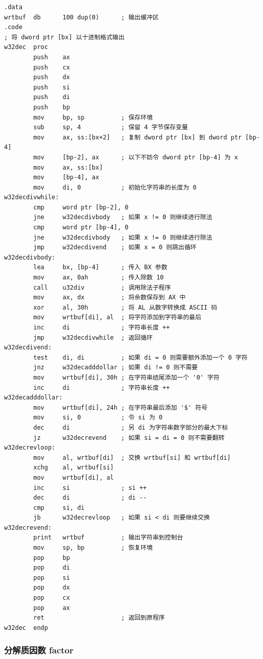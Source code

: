 \begin{lstlisting}[language={[x86masm]Assembler},morekeywords={}]
.data
wrtbuf  db      100 dup(0)      ; 输出缓冲区
.code
; 将 dword ptr [bx] 以十进制格式输出
w32dec  proc
        push    ax
        push    cx
        push    dx
        push    si
        push    di
        push    bp
        mov     bp, sp          ; 保存环境
        sub     sp, 4           ; 保留 4 字节保存变量
        mov     ax, ss:[bx+2]   ; 复制 dword ptr [bx] 到 dword ptr [bp-4]
        mov     [bp-2], ax      ; 以下不妨令 dword ptr [bp-4] 为 x
        mov     ax, ss:[bx]
        mov     [bp-4], ax
        mov     di, 0           ; 初始化字符串的长度为 0
w32decdivwhile:
        cmp     word ptr [bp-2], 0
        jne     w32decdivbody   ; 如果 x != 0 则继续进行除法
        cmp     word ptr [bp-4], 0
        jne     w32decdivbody   ; 如果 x != 0 则继续进行除法
        jmp     w32decdivend    ; 如果 x = 0 则跳出循环
w32decdivbody:
        lea     bx, [bp-4]      ; 传入 BX 参数
        mov     ax, 0ah         ; 传入除数 10
        call    u32div          ; 调用除法子程序
        mov     ax, dx          ; 将余数保存到 AX 中
        xor     al, 30h         ; 将 AL 从数字转换成 ASCII 码
        mov     wrtbuf[di], al  ; 将字符添加到字符串的最后
        inc     di              ; 字符串长度 ++
        jmp     w32decdivwhile  ; 返回循环
w32decdivend:
        test    di, di          ; 如果 di = 0 则需要额外添加一个 0 字符
        jnz     w32decadddollar ; 如果 di != 0 则不需要
        mov     wrtbuf[di], 30h ; 在字符串结尾添加一个 '0' 字符
        inc     di              ; 字符串长度 ++
w32decadddollar:
        mov     wrtbuf[di], 24h ; 在字符串最后添加 '$' 符号
        mov     si, 0           ; 令 si 为 0
        dec     di              ; 另 di 为字符串数字部分的最大下标
        jz      w32decrevend    ; 如果 si = di = 0 则不需要翻转
w32decrevloop:
        mov     al, wrtbuf[di]  ; 交换 wrtbuf[si] 和 wrtbuf[di]
        xchg    al, wrtbuf[si]
        mov     wrtbuf[di], al
        inc     si              ; si ++
        dec     di              ; di --
        cmp     si, di
        jb      w32decrevloop   ; 如果 si < di 则要继续交换
w32decrevend:
        print   wrtbuf          ; 输出字符串到控制台
        mov     sp, bp          ; 恢复环境
        pop     bp
        pop     di
        pop     si
        pop     dx
        pop     cx
        pop     ax
        ret                     ; 返回到原程序
w32dec  endp
\end{lstlisting}

\subsubsection{分解质因数 factor}

